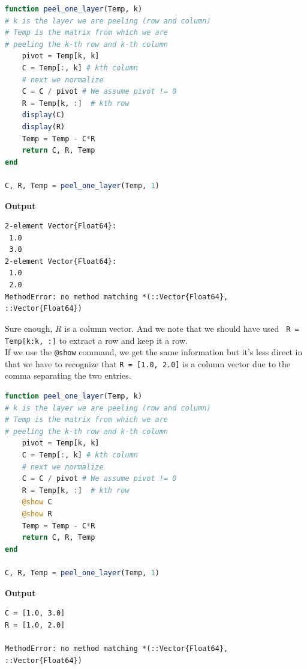 \begin{lstlisting}[language=Julia,style=mystyle]
function peel_one_layer(Temp, k)
# k is the layer we are peeling (row and column)
# Temp is the matrix from which we are
# peeling the k-th row and k-th column
    pivot = Temp[k, k]
    C = Temp[:, k] # kth column
    # next we normalize
    C = C / pivot # We assume pivot != 0
    R = Temp[k, :]  # kth row
    display(C)
    display(R)
    Temp = Temp - C*R
    return C, R, Temp
end

C, R, Temp = peel_one_layer(Temp, 1)
\end{lstlisting}
\textbf{Output} 
\begin{verbatim}
2-element Vector{Float64}:
 1.0
 3.0
2-element Vector{Float64}:
 1.0
 2.0
MethodError: no method matching *(::Vector{Float64}, ::Vector{Float64})
\end{verbatim}

Sure enough, $R$ is a column vector. And we note that we should have used \texttt{    R = Temp[k:k, :]} to extract a row and keep it a row.\\

If we use the \texttt{@show} command, we get the same information but it's less direct in that we have to recognize that \texttt{R = [1.0, 2.0]} is a column vector due to the comma separating the two entries.

\begin{lstlisting}[language=Julia,style=mystyle]
function peel_one_layer(Temp, k)
# k is the layer we are peeling (row and column)
# Temp is the matrix from which we are
# peeling the k-th row and k-th column
    pivot = Temp[k, k]
    C = Temp[:, k] # kth column
    # next we normalize
    C = C / pivot # We assume pivot != 0
    R = Temp[k, :]  # kth row
    @show C
    @show R
    Temp = Temp - C*R
    return C, R, Temp
end

C, R, Temp = peel_one_layer(Temp, 1)
\end{lstlisting}
\textbf{Output} 
\begin{verbatim}
C = [1.0, 3.0]
R = [1.0, 2.0]

MethodError: no method matching *(::Vector{Float64}, ::Vector{Float64})
\end{verbatim}




